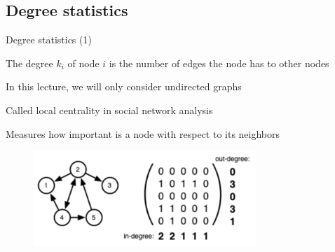 \subsection{Degree statistics}

\begin{frame}{Degree statistics (1)}

\begin{definition}[Degree]
\BI
\item The \alert{degree} $k_i$ of node $i$ is the number of edges the node has to other nodes
\item In this lecture, we will only consider undirected graphs
\item Called \alert{local centrality} in social network analysis
\item Measures how important is a node with respect to its neighbors
\EI
\end{definition}	

\begin{figure}
	\includegraphics[width=0.75\textwidth]{degree}
\end{figure}


\end{frame}

